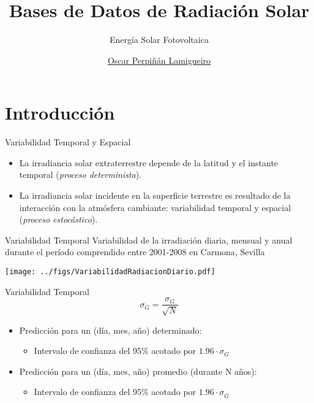 \documentclass[aspectratio=169, usenames,svgnames,dvipsnames]{beamer}
\author{\href{https://oscarperpinan.github.io}{Oscar Perpiñán Lamigueiro}}
\date{}
\title{Bases de Datos de Radiación Solar}
\subtitle{Energía Solar Fotovoltaica}
\institute[UPM]{Universidad Politécnica de Madrid}
\begin{document}
\maketitle

\section{Introducción}
\label{sec:org729837f}

\begin{frame}[label={sec:orgef7b050}]{Variabilidad Temporal y Espacial}
\begin{itemize}
\item La irradiancia solar extraterrestre depende de la latitud y el instante temporal (\emph{proceso determinista}).
\item La irradiancia solar incidente en la superficie terrestre es resultado de la interacción con la atmósfera cambiante: \alert{variabilidad temporal y espacial} (\emph{proceso estocástico}).
\end{itemize}
\end{frame}

\begin{frame}[label={sec:org40d22af}]{Variabilidad Temporal}
Variabilidad de la irradiación diaria, mensual y anual durante el período comprendido entre 2001-2008 en Carmona, Sevilla
\begin{center}
\texttt{[image: ../figs/VariabilidadRadiacionDiario.pdf]}
\end{center}

\nocite{Perpinan2009}
\end{frame}

\begin{frame}[label={sec:orgb9fe2a1}]{Variabilidad Temporal}
\[
\sigma_{\overline{G}}=\frac{\sigma_{G}}{\sqrt{N}}
\]

\begin{itemize}
\item Predicción para un (día, mes, año) \alert{determinado}: 

\begin{itemize}
\item Intervalo de confianza del 95\% acotado por \(1.96\cdot\sigma_{G}\)
\end{itemize}

\item Predicción para un (día, mes, año) \alert{promedio (durante N años)}: 

\begin{itemize}
\item Intervalo de confianza del 95\% acotado por \(1.96\cdot\sigma_{\overline{G}}\)
\end{itemize}
\end{itemize}
\end{frame}
\end{document}
